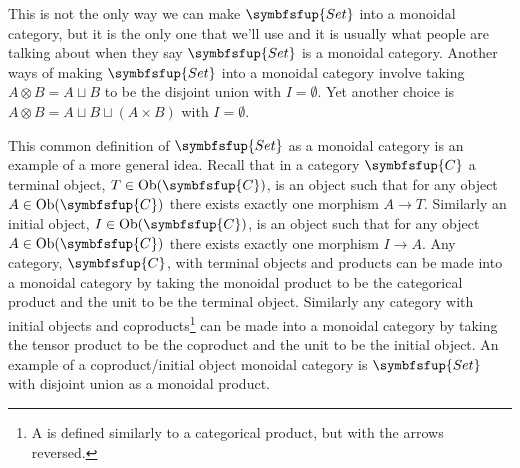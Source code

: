 \documentclass[fleqn]{NotesClass}
\makeatletter
\newcommand{\cat}[1]{\symbfsfup{#1}}
\newcommand{\c@egory}[1]{\symbfsfup{#1}}
\newcommand{\Set}{\c@egory{Set}}
\DeclareMathOperator{\Ob}{Ob}
\makeatother
\begin{document}
    \begin{wrn}
        This is not the only way we can make \(\Set\) into a monoidal category, but it is the only one that we'll use and it is usually what people are talking about when they say \(\Set\) is a monoidal category.
        Another ways of making \(\Set\) into a monoidal category involve taking \(A \otimes B = A \sqcup B\) to be the disjoint union with \(I = \emptyset\).
        Yet another choice is \(A \otimes B = A \sqcup B \sqcup (A \times B)\) with \(I = \emptyset\).
    \end{wrn}
    
    This common definition of \(\Set\) as a monoidal category is an example of a more general idea.
    Recall that in a category \(\cat{C}\) a terminal object, \(T \in \Ob(\cat{C})\), is an object such that for any object \(A \in \Ob(\cat{C})\) there exists exactly one morphism \(A \to T\).
    Similarly an initial object, \(I \in \Ob(\cat{C})\), is an object such that for any object \(A \in \Ob(\cat{C})\) there exists exactly one morphism \(I \to A\).
    Any category, \(\cat{C}\), with terminal objects and products can be made into a monoidal category by taking the monoidal product to be the categorical product and the unit to be the terminal object.
    Similarly any category with initial objects and coproducts\footnote{A  is defined similarly to a categorical product, but with the arrows reversed.} can be made into a monoidal category by taking the tensor product to be the coproduct and the unit to be the initial object.
    An example of a coproduct/initial object monoidal category is \(\Set\) with disjoint union as a monoidal product.
    
\end{document}
